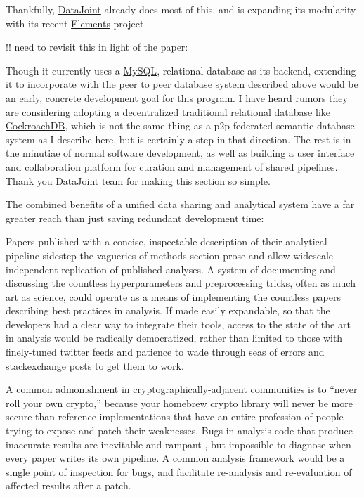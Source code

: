 \documentclass[11pt]{article}
\begin{document}
\begin{multicols}{2}
Thankfully, \href{https://datajoint.io/}{DataJoint} already does most of
this, and is expanding its modularity with its recent
\href{https://github.com/datajoint/datajoint-elements}{Elements}
project.

!! need to revisit this in light of the paper: \cite{yatsenkoDataJointElementsData2021} 

Though it currently uses a
\href{https://docs.datajoint.io/python/admin/1-hosting.html}{MySQL},
relational database as its backend, extending it to incorporate with the
peer to peer database system described above would be an early, concrete
development goal for this program. I have heard rumors they are
considering adopting a decentralized traditional relational database
like \href{https://www.cockroachlabs.com/product/}{CockroachDB}, which
is not the same thing as a p2p federated semantic database system as I
describe here, but is certainly a step in that direction. The rest is in
the minutiae of normal software development, as well as building a user
interface and collaboration platform for curation and management of
shared pipelines. Thank you DataJoint team for making this section so
simple.

The combined benefits of a unified data sharing and analytical system
have a far greater reach than just saving redundant development time:

Papers published with a concise, inspectable description of their
analytical pipeline sidestep the vagueries of methods section prose and
allow widescale independent replication of published analyses. A system
of documenting and discussing the countless hyperparameters and
preprocessing tricks, often as much art as science, could operate as a
means of implementing the countless papers describing best practices in
analysis. If made easily expandable, so that the developers had a clear
way to integrate their tools, access to the state of the art in analysis
would be radically democratized, rather than limited to those with
finely-tuned twitter feeds and patience to wade through seas of errors
and stackexchange posts to get them to work.

A common admonishment in cryptographically-adjacent communities is to
``never roll your own crypto,'' because your homebrew crypto library
will never be more secure than reference implementations that have an
entire profession of people trying to expose and patch their weaknesses.
Bugs in analysis code that produce inaccurate results are inevitable and
rampant \cite{millerScientistNightmareSoftware2006
soergelRampantSoftwareErrors2015, eklundClusterFailureWhy2016a
bhandarineupaneCharacterizationLeptazolinesPolar2019} , but
impossible to diagnose when every paper writes its own pipeline. A
common analysis framework would be a single point of inspection for
bugs, and facilitate re-analysis and re-evaluation of affected results
after a patch.


\end{multicols}
\end{document}
